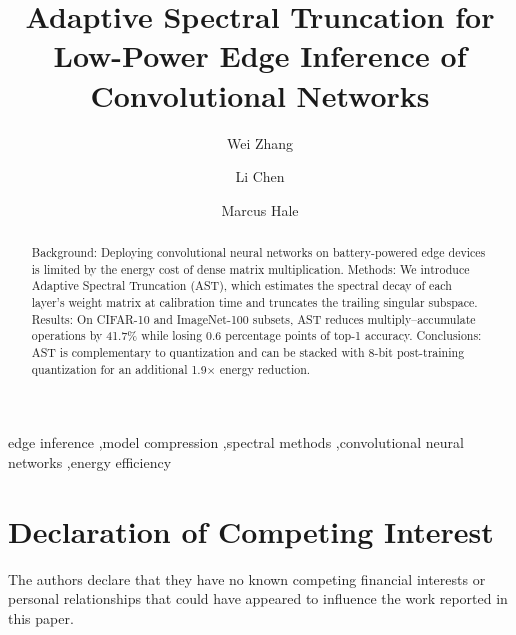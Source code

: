 \documentclass[preprint,12pt]{elsarticle}
\newcommand{\method}{Adaptive Spectral Truncation (AST)}
\begin{document}
\begin{frontmatter}
\title{Adaptive Spectral Truncation for Low-Power Edge Inference of Convolutional Networks}

\author[aff1]{Wei Zhang}
\author[aff1,aff2]{Li Chen}
\author[aff3]{Marcus Hale}

\begin{abstract}
Background: Deploying convolutional neural networks on battery-powered edge devices is
limited by the energy cost of dense matrix multiplication.
Methods: We introduce \method{}, which estimates the spectral decay of each layer's
weight matrix at calibration time and truncates the trailing singular subspace.
Results: On CIFAR-10 and ImageNet-100 subsets, AST reduces multiply--accumulate operations
by 41.7\% while losing 0.6 percentage points of top-1 accuracy.
Conclusions: AST is complementary to quantization and can be stacked with 8-bit
post-training quantization for an additional 1.9$\times$ energy reduction.
\end{abstract}

\begin{keyword}
edge inference \sep model compression \sep spectral methods \sep convolutional neural networks \sep energy efficiency
\end{keyword}
\end{frontmatter}






\section*{Declaration of Competing Interest}
The authors declare that they have no known competing financial interests or personal
relationships that could have appeared to influence the work reported in this paper.



\end{document}
